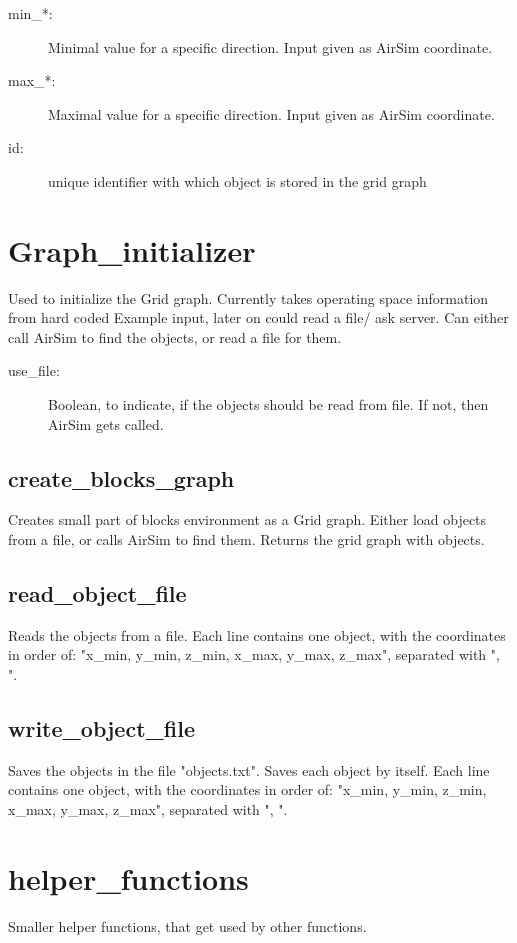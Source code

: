 \documentclass{article}
\begin{document}
\begin{description}
    \item[min\_*:] Minimal value for a specific direction. Input given as AirSim coordinate.
    \item[max\_*:] Maximal value for a specific direction. Input given as AirSim coordinate.
    \item[id:] unique identifier with which object is stored in the grid graph
\end{description}
    

\section{Graph\_initializer}
Used to initialize the Grid graph. Currently takes operating space information from hard coded Example input, later on could read a file/ ask server. Can either call AirSim to find the objects, or read a file for them.

\begin{description}
    \item[use\_file:] Boolean, to indicate, if the objects should be read from file. If not, then AirSim gets called.
\end{description}

\subsection{create\_blocks\_graph}
Creates small part of blocks environment as a Grid graph. Either load objects from a file, or calls AirSim to find them. Returns the grid graph with objects.

\subsection{read\_object\_file}
Reads the objects from a file. Each line contains one object, with the coordinates in order of: "x\_min, y\_min, z\_min, x\_max, y\_max, z\_max", separated with ", ".

\subsection{write\_object\_file}
Saves the objects in the file "objects.txt". Saves each object by itself. Each line contains one object, with the coordinates in order of: "x\_min, y\_min, z\_min, x\_max, y\_max, z\_max", separated with ", ".


\section{helper\_functions}
Smaller helper functions, that get used by other functions.
\end{document}
